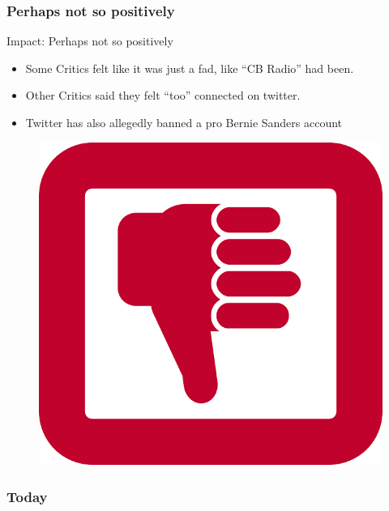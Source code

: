 \documentclass[xcolor=svgnames,handout]{beamer}
\begin{document}
\subsubsection{Perhaps not so positively}
\begin{frame}
{Impact: Perhaps not so positively}
	
	\begin{itemize}
		\item Some Critics felt like it was just a fad, like ``CB Radio'' had been.~\cite{johncdvorak2009}
		\item Other Critics said they felt ``too'' connected on twitter.~\cite{andrewlavallee2007}
		\item Twitter has also allegedly banned a pro Bernie Sanders account~\cite{getthewordout2016}
	\end{itemize}
	\begin{figure}[h]
		\centering
		\includegraphics[scale=0.15]{thumb-down.png}
		\caption{\cite{openclipartvectors}}
	\end{figure}

\end{frame}

\subsubsection{Today}
\end{document}
